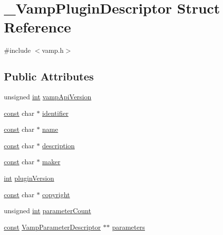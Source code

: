 \hypertarget{struct___vamp_plugin_descriptor}{}\section{\+\_\+\+Vamp\+Plugin\+Descriptor Struct Reference}
\label{struct___vamp_plugin_descriptor}


{\ttfamily \#include $<$vamp.\+h$>$}

\subsection*{Public Attributes}
\begin{DoxyCompactItemize}
\item 
unsigned \hyperlink{xmltok_8h_a5a0d4a5641ce434f1d23533f2b2e6653}{int} \hyperlink{struct___vamp_plugin_descriptor_ab6c87760e87ddaa9ac3491bccaaa28c2}{vamp\+Api\+Version}
\item 
\hyperlink{getopt1_8c_a2c212835823e3c54a8ab6d95c652660e}{const} char $\ast$ \hyperlink{struct___vamp_plugin_descriptor_a4915ec8276749cb505c01d25a6d02219}{identifier}
\item 
\hyperlink{getopt1_8c_a2c212835823e3c54a8ab6d95c652660e}{const} char $\ast$ \hyperlink{struct___vamp_plugin_descriptor_a9dd5a0190e4d453ff36b5acb7000b150}{name}
\item 
\hyperlink{getopt1_8c_a2c212835823e3c54a8ab6d95c652660e}{const} char $\ast$ \hyperlink{struct___vamp_plugin_descriptor_a9ff8050f92f1a04a68bb34a9d368295e}{description}
\item 
\hyperlink{getopt1_8c_a2c212835823e3c54a8ab6d95c652660e}{const} char $\ast$ \hyperlink{struct___vamp_plugin_descriptor_a4dca3d57331802964716edfa80580c9b}{maker}
\item 
\hyperlink{xmltok_8h_a5a0d4a5641ce434f1d23533f2b2e6653}{int} \hyperlink{struct___vamp_plugin_descriptor_a04427c420d9252c7796c0bf5101345ae}{plugin\+Version}
\item 
\hyperlink{getopt1_8c_a2c212835823e3c54a8ab6d95c652660e}{const} char $\ast$ \hyperlink{struct___vamp_plugin_descriptor_ae704bba384af0de056a26da1b13ee521}{copyright}
\item 
unsigned \hyperlink{xmltok_8h_a5a0d4a5641ce434f1d23533f2b2e6653}{int} \hyperlink{struct___vamp_plugin_descriptor_ae6271dc3ea0cea959c84a64185492cab}{parameter\+Count}
\item 
\hyperlink{getopt1_8c_a2c212835823e3c54a8ab6d95c652660e}{const} \hyperlink{vamp_8h_ae26a9d54a92f1c083a1b209a25a8e44e}{Vamp\+Parameter\+Descriptor} $\ast$$\ast$ \hyperlink{struct___vamp_plugin_descriptor_a64d614862604c31d6b84c49005f51913}{parameters}
$$
\end{DoxyCompactItemize}
